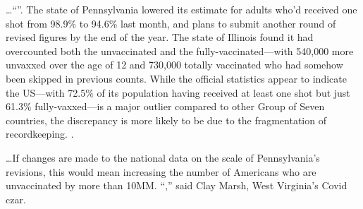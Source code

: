 \begin{refsection}
\begin{tcolorbox}[quote]
\dots{}\enquote{}. The state of Pennsylvania lowered its estimate for adults who'd received one shot from 98.9\% to 94.6\% last month, and plans to submit another round of revised figures by the end of the year. The state of Illinois found it had overcounted both the unvaccinated and the fully-vaccinated---with 540,000 more unvaxxed over the age of 12 and 730,000 totally vaccinated who had somehow been skipped in previous counts. While the official statistics appear to indicate the US---with 72.5\% of its population having received at least one shot but just 61.3\% fully-vaxxed---is a major outlier compared to other Group of Seven countries, the discrepancy is more likely to be due to the fragmentation of recordkeeping. .\textsuperscript{\cite{url90ycv2k1}}

\end{tcolorbox}

\begin{tcolorbox}[quote]

\dots{}If changes are made to the national data on the scale of Pennsylvania's revisions, this would mean increasing the number of Americans who are unvaccinated by more than 10MM. \enquote{,} said Clay Marsh, West Virginia's Covid czar.\textsuperscript{\cite{url90ycv2k1}}

\end{tcolorbox}

\printbibliography[heading=subbibliography]

\end{refsection}